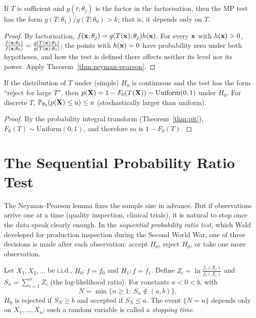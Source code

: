 \documentclass[main.tex]{subfiles}
\begin{document}
\begin{corollary}\label{cor:np-yeterli}
If $T$ is sufficient and $g(t;\theta_j)$ is the factor in the factorisation, then the MP test has the form $g(T;\theta_1)/g(T;\theta_0)>k$; that is, it depends only on $T$.
\end{corollary}
\begin{proof}
By factorisation, $f(\mathbf{x};\theta_j)=g(T(\mathbf{x});\theta_j)h(\mathbf{x})$. For every $\mathbf{x}$ with $h(\mathbf{x})>0$,
$\frac{f(\mathbf{x};\theta_1)}{f(\mathbf{x};\theta_0)}=\frac{g(T(\mathbf{x});\theta_1)}{g(T(\mathbf{x});\theta_0)}$; the points with $h(\mathbf{x})=0$ have probability zero under both hypotheses, and how the test is defined there affects neither its level nor its power. Apply Theorem~\ref{thm:neyman-pearson}.
\end{proof}

\begin{theorem}\label{thm:p-uniform}
If the distribution of $T$ under (simple) $H_0$ is continuous and the test has the form ``reject for large $T$'', then $p(\mathbf{X})=1-F_0(T(\mathbf{X}))\sim\text{Uniform}(0,1)$ under $H_0$. For discrete $T$, $\mathbb{P}_{\theta_0}(p(\mathbf{X})\le u)\le u$ (stochastically larger than uniform).
\end{theorem}
\begin{proof}
By the probability integral transform (Theorem~\ref{thm:pit}), $F_0(T)\sim\text{Uniform}(0,1)$, and therefore so is $1-F_0(T)$.
\end{proof}

\section{The Sequential Probability Ratio Test}

The Neyman--Pearson lemma fixes the sample size in advance. But if observations arrive one at a time (quality inspection, clinical trials), it is natural to stop once the data speak clearly enough. In the \emph{sequential probability ratio test}, which Wald \cite{wald45} developed for production inspection during the Second World War, one of three decisions is made after each observation: accept $H_0$, reject $H_0$, or take one more observation.

\begin{definition}[SPRT]\label{def:sprt}
Let $X_1,X_2,\dots$ be i.i.d., $H_0:f=f_0$ and $H_1:f=f_1$. Define $Z_i=\ln\frac{f_1(X_i)}{f_0(X_i)}$ and $S_n=\sum_{i=1}^nZ_i$ (the log-likelihood ratio). For constants $a<0<b$, with
\[
N=\min\{n\ge1:\ S_n\notin(a,b)\},
\]
$H_0$ is rejected if $S_N\ge b$ and accepted if $S_N\le a$. The event $\{N=n\}$ depends only on $X_1,\dots,X_n$; such a random variable is called a \emph{stopping time}.
\end{definition}
\end{document}
